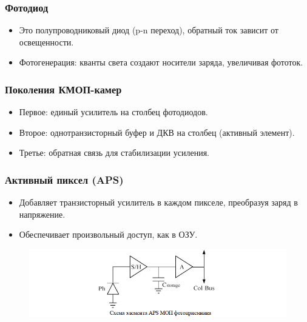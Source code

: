 	\subsubsection{Фотодиод}
	\begin{itemize}
		\item Это полупроводниковый диод (p-n переход), обратный ток зависит от освещенности.
		\item Фотогенерация: кванты света создают носители заряда, увеличивая фототок.
	\end{itemize}
	\vspace{-1.25em}
	\subsubsection{Поколения КМОП-камер}
	\begin{itemize}
		\item Первое: единый усилитель на столбец фотодиодов.
		\item Второе: однотранзисторный буфер и ДКВ на столбец (активный элемент).
		\item Третье: обратная связь для стабилизации усиления.
	\end{itemize}
	\vspace{-1.25em}
	\subsubsection{Активный пиксел (APS)}
	\begin{itemize}
		\item Добавляет транзисторный усилитель в каждом пикселе, преобразуя заряд в напряжение.
		\item Обеспечивает произвольный доступ, как в ОЗУ.
	\end{itemize}
	\vspace{-1.25em}
	\begin{figure}[H]
		\centering
		\includegraphics[width=1\linewidth, height=0.15\textheight]{img/04_05}
		\label{fig:04_05}
	\end{figure}
	
	\newpage
	
